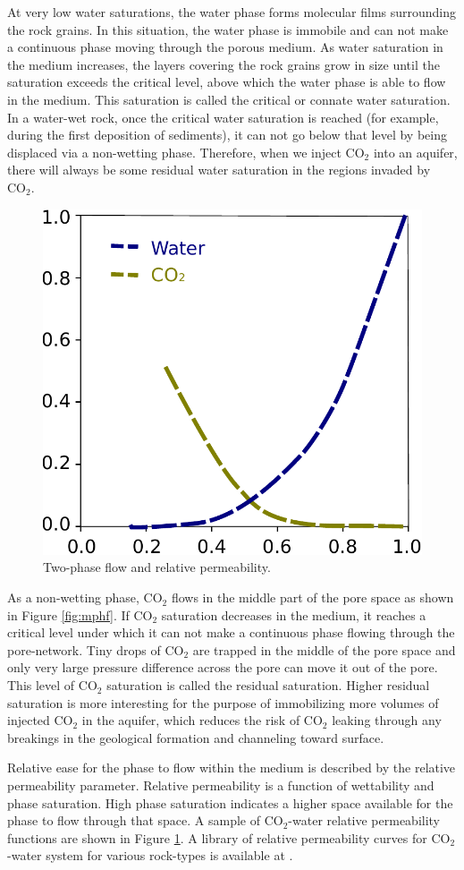 At very low water saturations, the water phase forms molecular films surrounding the rock grains. In this situation, the water phase is immobile and can not make a continuous phase moving through the porous medium.
As water saturation in the medium increases, the layers covering the rock grains
grow in size until the saturation exceeds the critical level, above which the
water phase is able to flow in the medium. This saturation is called the
critical or connate water saturation. In a water-wet rock, once the
critical water saturation
is reached (for example, during the first deposition of sediments), it can not
go below that level by being displaced via a non-wetting phase. Therefore, when
we inject $\mbox{CO}_2$ into an aquifer, there will always be some residual
water saturation in the regions invaded by $\mbox{CO}_2$.

\begin{figure} 
  \centering{}
  \includegraphics[width= 0.45 \linewidth]{./figurer/Kr}
  \caption{Two-phase flow and relative permeability.}
  \label{fig:kr}
\end{figure}

As a non-wetting phase, $\mbox{CO}_2$ flows in the middle part of the pore space
as shown in Figure \ref{fig:mphf}. If $\mbox{CO}_2$ saturation decreases in the
medium, it reaches a critical level under which it can not make a continuous
phase flowing through the pore-network. Tiny drops of $\mbox{CO}_2$ are trapped
in the middle of the pore space and only very large pressure difference across
the pore can move it out of the pore. This level of $\mbox{CO}_2$ saturation  is
called the residual saturation. Higher residual saturation is more interesting
for the purpose of immobilizing more volumes of injected $\mbox{CO}_2$ in the
aquifer, which reduces the risk of $\mbox{CO}_2$ leaking through any breakings
in the geological formation and channeling toward surface.

Relative ease for the phase to flow within the medium is described by
the relative
permeability parameter. Relative permeability is a function of wettability and
phase saturation. High phase saturation indicates a higher space available for
the phase to flow through that space. A sample of $\mbox{CO}_2$-water relative
permeability functions are shown in Figure \ref{fig:kr}. A library of relative
permeability curves for $\mbox{CO}_2$-water system for various rock-types is
available at \cite{krLib}.


